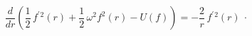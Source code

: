 \begin{equation}
\frac{d}{dr}\left( \frac{1}{2}\,f^{\prime }{}^{2}(r)+\frac{1}{2}\,\omega
^{2}f^{2}(r)-U(f)\right) =-\frac{2}{r}\,f^{\prime }{}^{2}(r)\ \cdot
\label{od}
\end{equation}%
